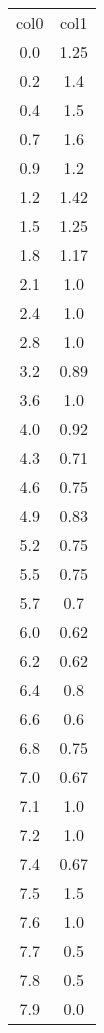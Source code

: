 \begin{table}
\begin{tabular}{cc}
col0 & col1 \\
0.0 & 1.25 \\
0.2 & 1.4 \\
0.4 & 1.5 \\
0.7 & 1.6 \\
0.9 & 1.2 \\
1.2 & 1.42 \\
1.5 & 1.25 \\
1.8 & 1.17 \\
2.1 & 1.0 \\
2.4 & 1.0 \\
2.8 & 1.0 \\
3.2 & 0.89 \\
3.6 & 1.0 \\
4.0 & 0.92 \\
4.3 & 0.71 \\
4.6 & 0.75 \\
4.9 & 0.83 \\
5.2 & 0.75 \\
5.5 & 0.75 \\
5.7 & 0.7 \\
6.0 & 0.62 \\
6.2 & 0.62 \\
6.4 & 0.8 \\
6.6 & 0.6 \\
6.8 & 0.75 \\
7.0 & 0.67 \\
7.1 & 1.0 \\
7.2 & 1.0 \\
7.4 & 0.67 \\
7.5 & 1.5 \\
7.6 & 1.0 \\
7.7 & 0.5 \\
7.8 & 0.5 \\
7.9 & 0.0 \\
\end{tabular}
\end{table}
